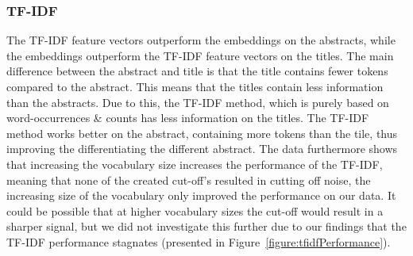 \documentclass[runningheads]{llncs}
\begin{document}
\subsubsection{TF-IDF}
The TF-IDF feature vectors outperform the embeddings on the abstracts, while the embeddings outperform the TF-IDF feature vectors on the titles. The main difference between the abstract and title is that the title contains fewer tokens compared to the abstract. This means that the titles contain less information than the abstracts. Due to this, the TF-IDF method, which is purely based on word-occurrences \& counts has less information on the titles. The TF-IDF method works better on the abstract, containing more tokens than the tile, thus improving the differentiating the different abstract. The data furthermore shows that increasing the vocabulary size increases the performance of the TF-IDF, meaning that none of the created cut-off's resulted in cutting off noise, the increasing size of the vocabulary only improved the performance on our data. It could be possible that at higher vocabulary sizes the cut-off would result in a sharper signal, but we did not investigate this further due to our findings that the TF-IDF performance stagnates (presented in Figure~\ref{figure:tfidfPerformance}).
\end{document}
